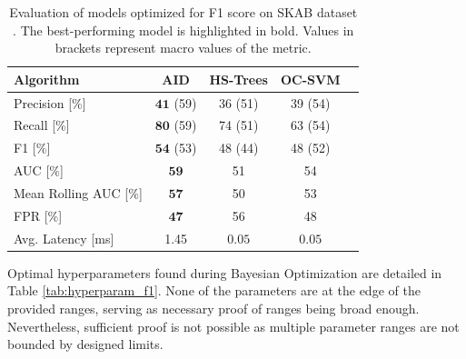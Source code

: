 \begin{table}[htbp]
    \caption{Evaluation of models optimized for F1 score on SKAB dataset \citep{skab2020}. The best-performing model is highlighted in bold. Values in brackets represent macro values of the metric.}
    \begin{center}
        \label{tab:perf_comp_f1}
        \begin{tabular}{|l|c|c|c|c|}
            \hline
            \textbf{Algorithm}      & AID                    & HS-Trees            & OC-SVM              \\
            \hline
            Precision [$\%$]        & $\boldsymbol{41}$ (59) & 36 (51)             & 39 (54)             \\
            \hline
            Recall [$\%$]           & $\boldsymbol{80}$ (59) & 74 (51)             & 63 (54)             \\
            \hline
            F1 [$\%$]               & $\boldsymbol{54}$ (53) & 48 (44)             & 48 (52)             \\
            \hline
            AUC [$\%$]              & $\boldsymbol{59}$      & 51                  & 54                  \\
            \hline
            Mean Rolling AUC [$\%$] & $\boldsymbol{57}$      & 50                  & 53                  \\
            \hline
            FPR [$\%$]              & $\boldsymbol{47}$      & 56                  & 48                  \\
            \hline
            Avg. Latency [ms]       & 1.45                   & $\boldsymbol{0.05}$ & $\boldsymbol{0.05}$ \\
            \hline
        \end{tabular}
    \end{center}
\end{table}

Optimal hyperparameters found during Bayesian Optimization are detailed in Table \ref{tab:hyperparam_f1}. None of the parameters are at the edge of the provided ranges, serving as necessary proof of ranges being broad enough. Nevertheless, sufficient proof is not possible as multiple parameter ranges are not bounded by designed limits.

